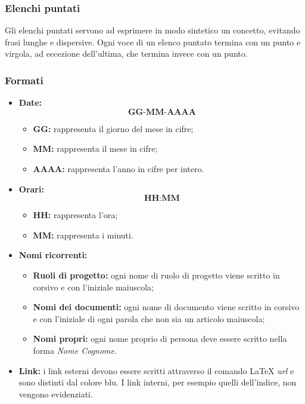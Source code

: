 \documentclass[../NormediProgetto.tex]{subfiles}
\begin{document}
\subsubsection{Elenchi puntati}

Gli elenchi puntati servono ad esprimere in modo sintetico un concetto, evitando frasi lunghe e dispersive. Ogni voce di un elenco puntato termina con un punto e virgola, ad eccezione dell'ultima, che termina invece con un punto.

\subsubsection{Formati}

\begin{itemize}

\item{\textbf{Date:}}  \[\textbf{GG-MM-AAAA}\]
\begin{itemize}
\item{\textbf{GG:}} rappresenta il giorno del mese in cifre;
\item{\textbf{MM:}} rappresenta il mese in cifre;
\item{\textbf{AAAA:}} rappresenta l'anno in cifre per intero.

\end{itemize}

\item{\textbf{Orari:}} \[\textbf{HH:MM}\]
\begin{itemize}
\item{\textbf{HH:}} rappresenta l'ora;
\item{\textbf{MM:}} rappresenta i minuti.
\end{itemize}

\item{\textbf{Nomi ricorrenti:}}
\begin{itemize}
\item{\textbf{Ruoli di progetto:}} ogni nome di ruolo di progetto viene scritto in corsivo e con l’iniziale maiuscola;
\item{\textbf{Nomi dei documenti:}} ogni nome di documento viene scritto in corsivo e con l’iniziale di ogni parola che non sia un articolo maiuscola;
\item{\textbf{Nomi propri:}} ogni nome proprio di persona deve essere scritto nella forma \textit{Nome Cognome}.
\end{itemize}

\item{\textbf{Link:}} i link esterni devono essere scritti attraverso il comando \LaTeX{} \textit{url} e sono distinti dal colore blu. I link interni, per esempio quelli dell'indice, non vengono evidenziati.
\end{itemize}
\end{document}
